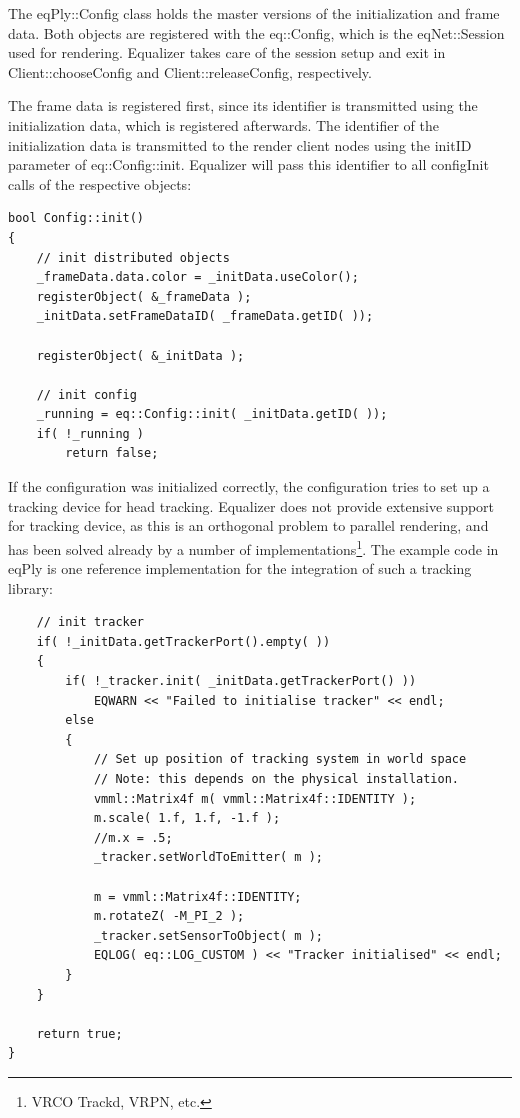 \documentclass[10pt,a4]{scrartcl}
\begin{document}
The \textsf{eqPly::Config} class holds the master versions of the
initialization and frame data. Both objects are registered with the
\textsf{eq::Config}, which is the \textsf{eqNet::Session} used for
rendering. Equalizer takes care of the session setup and exit in
\textsf{Client::choose\-Config} and \textsf{Client::releaseConfig},
respectively.

The frame data is registered first, since its identifier is transmitted
using the initialization data, which is registered afterwards. The
identifier of the initialization data is transmitted to the render
client nodes using the \textsf{initID} parameter of
\textsf{eq::Config::init}. Equalizer will pass this identifier to all
\textsf{configInit} calls of the respective objects:

{\footnotesize\begin{lstlisting}
bool Config::init()
{
    // init distributed objects
    _frameData.data.color = _initData.useColor();
    registerObject( &_frameData );
    _initData.setFrameDataID( _frameData.getID( ));

    registerObject( &_initData );

    // init config
    _running = eq::Config::init( _initData.getID( ));
    if( !_running )
        return false;
\end{lstlisting}}

If the configuration was initialized correctly, the configuration tries
to set up a tracking device for head tracking. Equalizer does not
provide extensive support for tracking device, as this is an orthogonal
problem to parallel rendering, and has been solved already by a number
of implementations\footnote{VRCO Trackd, VRPN, etc.}. The example
code in \textsf{eqPly} is one reference implementation for the
integration of such a tracking library:

{\footnotesize\begin{lstlisting}
    // init tracker
    if( !_initData.getTrackerPort().empty( ))
    {
        if( !_tracker.init( _initData.getTrackerPort() ))
            EQWARN << "Failed to initialise tracker" << endl;
        else
        {
            // Set up position of tracking system in world space
            // Note: this depends on the physical installation.
            vmml::Matrix4f m( vmml::Matrix4f::IDENTITY );
            m.scale( 1.f, 1.f, -1.f );
            //m.x = .5;
            _tracker.setWorldToEmitter( m );

            m = vmml::Matrix4f::IDENTITY;
            m.rotateZ( -M_PI_2 );
            _tracker.setSensorToObject( m );
            EQLOG( eq::LOG_CUSTOM ) << "Tracker initialised" << endl;
        }
    }

    return true;
}
\end{lstlisting}}%
\end{document}
